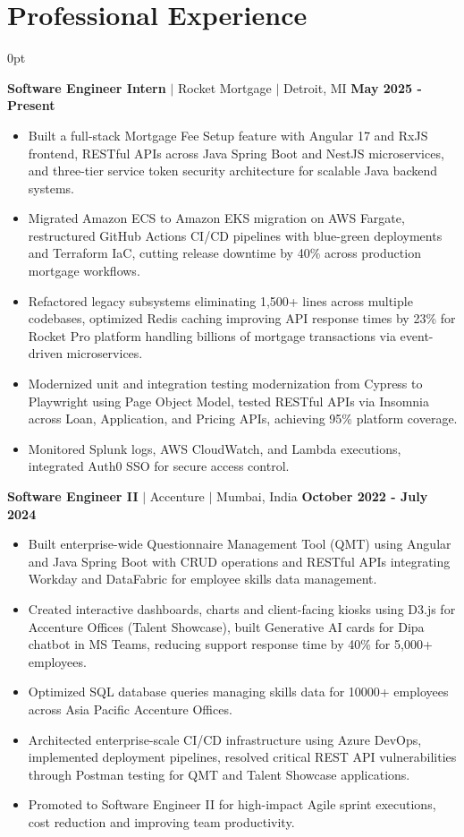 \documentclass[letterpaper,10pt]{article}
\newlength{\contentindent}
\newcommand{\sectioncontent}[1]{%
  \begin{adjustwidth}{\contentindent}{0pt}%
  #1%
  \end{adjustwidth}%
}
\begin{document}
\section{Professional Experience}
\sectioncontent{
\textbf{Software Engineer Intern} $|$ Rocket Mortgage $|$ Detroit, MI \hfill \textbf{May 2025 - Present}
\begin{itemize}
    \item Built a full-stack Mortgage Fee Setup feature with Angular 17 and RxJS frontend, RESTful APIs across Java Spring Boot and NestJS microservices, and three-tier service token security architecture for scalable Java backend systems.
    \item Migrated Amazon ECS to Amazon EKS migration on AWS Fargate, restructured GitHub Actions CI/CD pipelines with blue-green deployments and Terraform IaC, cutting release downtime by 40\% across production mortgage workflows.
    \item Refactored legacy subsystems eliminating 1,500+ lines across multiple codebases, optimized Redis caching improving API response times by 23\% for Rocket Pro platform handling billions of mortgage transactions via event-driven microservices.
    \item Modernized unit and integration testing modernization from Cypress to Playwright using Page Object Model, tested RESTful APIs via Insomnia across Loan, Application, and Pricing APIs, achieving 95\% platform coverage.
    \item Monitored Splunk logs, AWS CloudWatch, and Lambda executions, integrated Auth0 SSO for secure access control.
\end{itemize}

\textbf{Software Engineer II} $|$ Accenture $|$ Mumbai, India \hfill \textbf{October 2022 - July 2024}
\begin{itemize}
    \item Built enterprise-wide Questionnaire Management Tool (QMT) using Angular and Java Spring Boot with CRUD operations and RESTful APIs integrating Workday and DataFabric for employee skills data management.
    \item Created interactive dashboards, charts and client-facing kiosks using D3.js for Accenture Offices (Talent Showcase), built Generative AI cards for Dipa chatbot in MS Teams, reducing support response time by 40\% for 5,000+ employees.
    \item Optimized SQL database queries managing skills data for 10000+ employees across Asia Pacific Accenture Offices.
    \item Architected enterprise-scale CI/CD infrastructure using Azure DevOps, implemented deployment pipelines, resolved critical REST API vulnerabilities through Postman testing for QMT and Talent Showcase applications.
    \item Promoted to Software Engineer II for high-impact Agile sprint executions, cost reduction and improving team productivity.
\end{itemize}}
\end{document}
